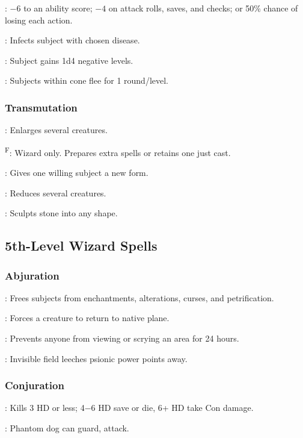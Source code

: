 	: $-6$ to an ability score; $-4$ on attack rolls, saves, and checks; or 50\% chance of losing each action.

	: Infects subject with chosen disease.

	: Subject gains 1d4 negative levels.

	: Subjects within cone flee for 1 round/level.

\subsubsection{Transmutation}
	: Enlarges several creatures.

	\textsuperscript{F}: Wizard only. Prepares extra spells or retains one just cast.

	: Gives one willing subject a new form.

	: Reduces several creatures.

	: Sculpts stone into any shape.



\subsection{5th-Level Wizard Spells}

\subsubsection{Abjuration}
	: Frees subjects from enchantments, alterations, curses, and petrification.

	: Forces a creature to return to native plane.

	: Prevents anyone from viewing or scrying an area for 24 hours.

	: Invisible field leeches psionic power points away.

\subsubsection{Conjuration}
	: Kills 3 HD or less; 4$-6$ HD save or die, 6+ HD take Con damage.

	: Phantom dog can guard, attack.

